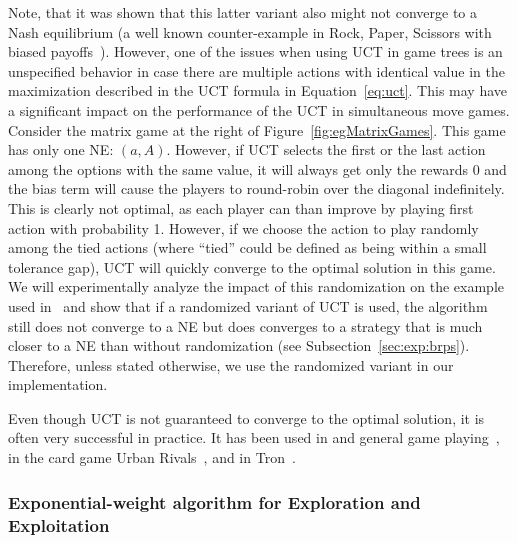 Note, that it was shown that this latter variant also might not converge to a Nash equilibrium (a well known counter-example in Rock, Paper, Scissors with biased payoffs~\cite{Shafiei09}).
However, one of the issues when using UCT in game trees is an unspecified behavior in case there are multiple actions with identical value in the maximization described in the UCT formula in Equation~\ref{eq:uct}.
This may have a significant impact on the performance of the UCT in simultaneous move games.
Consider the matrix game at the right of Figure~\ref{fig:egMatrixGames}.
This game has only one NE: $(a,A)$. However, if UCT selects the first or the last action among the options with the same value, it will always get only the rewards 0 and the bias term will cause the players to round-robin over the diagonal indefinitely. This is clearly not optimal, as each player can than improve by playing first action with probability 1. However, if we choose the action to play randomly among the tied actions (where ``tied'' could be defined as being within a small tolerance gap), UCT will quickly converge to the optimal solution in this game.
We will experimentally analyze the impact of this randomization on the example used in~\cite{Shafiei09} and show that if a randomized variant of UCT is used, the algorithm still does not converge to a NE but does converges to a strategy that is much closer to a NE than without randomization (see Subsection~\ref{sec:exp:brps}).
Therefore, unless stated otherwise, we use the randomized variant in our implementation.

Even though UCT is not guaranteed to converge to the optimal solution, it is often very successful in practice.
It has been used in and general game playing~\cite{Finnsson12}, in the card game Urban Rivals~\cite{Teytaud11Upper},
and in Tron~\cite{Perick12Comparison}.


\subsubsection{Exponential-weight algorithm for Exploration and Exploitation}\label{sec:exp3}

